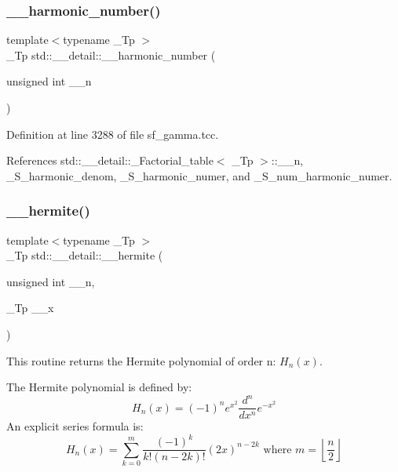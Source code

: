 \subsubsection{\texorpdfstring{\+\_\+\+\_\+harmonic\+\_\+number()}{\_\_harmonic\_number()}}
{\footnotesize\ttfamily template$<$typename \+\_\+\+Tp $>$ \\
\+\_\+\+Tp std\+::\+\_\+\+\_\+detail\+::\+\_\+\+\_\+harmonic\+\_\+number (\begin{DoxyParamCaption}\item[{unsigned int}]{\+\_\+\+\_\+n }\end{DoxyParamCaption})}



Definition at line 3288 of file sf\+\_\+gamma.\+tcc.



References std\+::\+\_\+\+\_\+detail\+::\+\_\+\+Factorial\+\_\+table$<$ \+\_\+\+Tp $>$\+::\+\_\+\+\_\+n, \+\_\+\+S\+\_\+harmonic\+\_\+denom, \+\_\+\+S\+\_\+harmonic\+\_\+numer, and \+\_\+\+S\+\_\+num\+\_\+harmonic\+\_\+numer.

\mbox{\label{namespacestd_1_1____detail_aeb57881dd224320629e184c9118c910b}} 
\subsubsection{\texorpdfstring{\+\_\+\+\_\+hermite()}{\_\_hermite()}}
{\footnotesize\ttfamily template$<$typename \+\_\+\+Tp $>$ \\
\+\_\+\+Tp std\+::\+\_\+\+\_\+detail\+::\+\_\+\+\_\+hermite (\begin{DoxyParamCaption}\item[{unsigned int}]{\+\_\+\+\_\+n,  }\item[{\+\_\+\+Tp}]{\+\_\+\+\_\+x }\end{DoxyParamCaption})}



This routine returns the Hermite polynomial of order n\+: $ H_n(x) $. 

The Hermite polynomial is defined by\+: \[ H_n(x) = (-1)^n e^{x^2} \frac{d^n}{dx^n} e^{-x^2} \] An explicit series formula is\+: \[ H_n(x) = \sum_{k=0}^{m} \frac{(-1)^k}{k!(n-2k)!}(2x)^{n-2k} \mbox{ where } m = \left\lfloor{\frac{n}{2}}\right\rfloor \]

